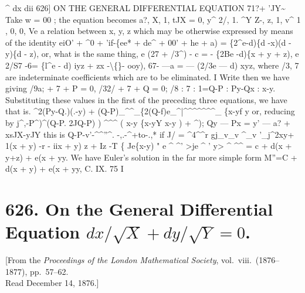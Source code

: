 \documentclass[11pt,a4paper]{book}
\begin{document}
\textasciicircum{}
dx
dii
626]
ON THE GENERAL DIFFERENTIAL EQUATION 71?+ 'JY\textasciitilde{}
Take w = 00
;
the equation becomes
a?,
X,
1,
tJX
= 0,
y\textasciicircum{}
2/,
1.
\textasciicircum{}Y
Z-,
z,
1,
v\textasciicircum{}
1
,
0,
0,
Ve
a relation between
x,
y, z
which may be otherwise expressed by means of the
identity
eiO' + \textasciicircum{}0 + 'if-\{ee* + de\textasciicircum{} + 00' + he + a) = \{2\textasciicircum{}e-d)\{d -x)(d - y)\{d - z),
or, what
is the same
thing,
e (27 + /3\textasciicircum{}) - c = - \{2Be -d)\{x + y + z),
e
2/S7
-6=
\{l\textasciicircum{}e - d) iyz + zx
-\textbackslash\{\}- ooy),
67-
---a = --- (2/3e --- d) xyz,
where
/3, 7 are indeterminate
coefficients which are
to be
eliminated.
\textbullet{}I
Write
then we have
giving
/9a; + 7 + P = 0,
/32/ + 7 + Q = 0;
/8
: 7
: 1=Q-P
: Py-Qx
: x-y.
Substituting these values
in the
first of the preceding three
equations, we have
that
is.
\textasciicircum{}2(Py-Q.)(.-y) + (Q-P)\guillemotright{}\_\textasciicircum{}\textasciicircum{}\_\{2(Q-f)e\_\textasciicircum{}|\textasciicircum{}\textasciicircum{}\textasciicircum{}\textasciicircum{}\textasciicircum{}\textasciicircum{}\textasciicircum{}\_
\{x-yf
y
or, reducing by
j\textasciicircum{},-P\textasciicircum{})\textasciicircum{}(Q-P.
2JQ-P)
)
\textasciicircum{}\textasciicircum{}\textasciicircum{}
(
x-y
\{x-yY
x-y
)
+ \textasciicircum{});
Qy --- Px = y' --- a? + xsJX-yJY
this
is
Q-P-v'-\textasciicircum{}\textasciicircum{}''\textasciicircum{}.
-,.-\textasciicircum{}+to-.,*
if J/ = \textasciicircum{}4\textasciicircum{}\textasciicircum{}r
gj\_v\_v
\textasciicircum{}\_v
'\_j\textasciicircum{}2xy+
1(x + y) -r - iix + y) z + Iz
-T
\{
\guillemotright{}Je\{x-y)
"
e
\textasciicircum{}
\textasciicircum{}' >je
\textasciicircum{}
' y>
\textasciicircum{}
\textasciicircum{}\textasciicircum{}
= c + d(x + y+z) + e(x + yy.
We have
Euler's solution
in the
far more simple form
M''=C + d(x + y) + e(x + yy,
C.
IX.
75
I


\newpage
\section*{626. On the General Differential Equation $dx/\sqrt{X} + dy/\sqrt{Y} = 0$.}

\begin{center}
\small[From the \textit{Proceedings of the London Mathematical Society}, vol.~viii.\ (1876--1877), pp.~57--62.\\Read December 14, 1876.]
\end{center}
\end{document}
